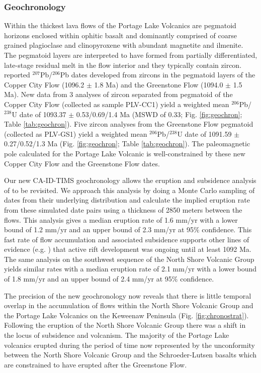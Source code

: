 \documentclass[11pt,letterpaper]{article}
\begin{document}
\subsubsection{Geochronology}

Within the thickest lava flows of the Portage Lake Volcanics are pegmatoid horizons enclosed within ophitic basalt and dominantly comprised of coarse grained plagioclase and clinopyroxene with abundant magnetite and ilmenite. The pegmatoid layers are interpreted to have formed from partially differentiated, late-stage residual melt in the flow interior \citep{Longo1984a} and they typically contain zircon. \cite{Davis1990a} reported $^{207}$Pb/$^{206}$Pb dates developed from zircons in the pegmatoid layers of the Copper City Flow (1096.2 $\pm$ 1.8 Ma) and the Greenstone Flow (1094.0 $\pm$ 1.5 Ma). New data from 3 analyses of zircon separated from pegmatoid of the Copper City Flow (collected as sample PLV-CC1) yield a weighted mean $^{206}$Pb/$^{238}$U date of 1093.37 $\pm$ 0.53/0.69/1.4 Ma (MSWD of 0.33; Fig. \ref{fig:geochron}; Table \ref{tab:geochron}). Five zircon analyses from the Greenstone Flow pegmatoid (collected as PLV-GS1) yield a weighted mean $^{206}$Pb/$^{238}$U date of 1091.59 $\pm$ 0.27/0.52/1.3 Ma (Fig. \ref{fig:geochron}; Table \ref{tab:geochron}). The paleomagnetic pole calculated for the Portage Lake Volcanic is well-constrained by these new Copper City Flow and the Greenstone Flow dates.

Our new CA-ID-TIMS geochronology allows the eruption and subsidence analysis of \cite{Davis1990a} to be revisited. We approach this analysis by doing a Monte Carlo sampling of dates from their underlying distribution and calculate the implied eruption rate from these simulated date pairs using a thickness of 2850 meters between the flows. This analysis gives a median eruption rate of 1.6 mm/yr with a lower bound of 1.2 mm/yr and an upper bound of 2.3 mm/yr at 95$\%$ confidence. This fast rate of flow accumulation and associated subsidence supports other lines of evidence (e.g. \citealp{Fairchild2017a}) that active rift development was ongoing until at least 1092 Ma. The same analysis on the southwest sequence of the North Shore Volcanic Group yields similar rates with a median eruption rate of 2.1 mm/yr with a lower bound of 1.8 mm/yr and an upper bound of 2.4 mm/yr at 95$\%$ confidence.

The precision of the new geochronology now reveals that there is little temporal overlap in the accumulation of flows within the North Shore Volcanic Group and the Portage Lake Volcanics on the Keweenaw Peninsula (Fig. \ref{fig:chronostrat}). Following the eruption of the North Shore Volcanic Group there was a shift in the locus of subsidence and volcanism. The majority of the Portage Lake volcanics erupted during the period of time now represented by the unconformity between the North Shore Volcanic Group and the Schroeder-Lutsen basalts which are constrained to have erupted after the Greenstone Flow.
\end{document}
